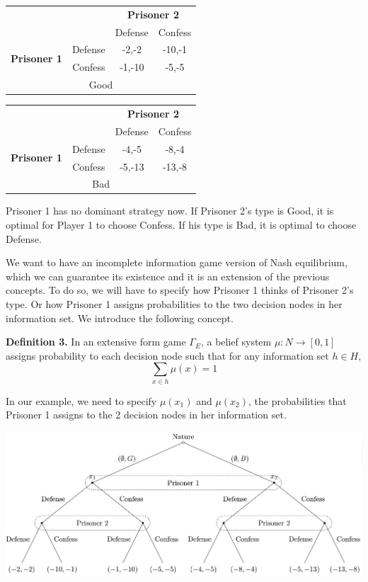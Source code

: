 \documentclass[12pt, oneside]{article}
\begin{document}
\begin{table}[h]
    \renewcommand{\arraystretch}{1.2}
    \setlength{\tabcolsep}{8pt}
    \begin{tabular}{c c|c c|}
        \multicolumn{2}{c}{} & \multicolumn{2}{c}{\textbf{Prisoner 2}} \\
        \multicolumn{2}{c}{} & Defense & Confess \\
        \cline{2-4}
        \multirow{2}{*}{\textbf{Prisoner 1}} & Defense & -2,-2 & -10,-1 \\
        & Confess & -1,-10 & -5,-5 \\
        \cline{2-4}
        \multicolumn{4}{c}{Good}
    \end{tabular}
    \hspace{1cm}
    \begin{tabular}{c c|c c|}
        \multicolumn{2}{c}{} & \multicolumn{2}{c}{\textbf{Prisoner 2}} \\
        \multicolumn{2}{c}{} & Defense & Confess \\
        \cline{2-4}
        \multirow{2}{*}{\textbf{Prisoner 1}} & Defense & -4,-5 & -8,-4 \\
        & Confess & -5,-13 & -13,-8 \\
        \cline{2-4}
        \multicolumn{4}{c}{Bad}
    \end{tabular}
\end{table}

Prisoner 1 has no dominant strategy now. If Prisoner 2's type is Good, it is optimal for Player 1 to choose Confess. If his type is Bad, it is optimal to choose Defense.

We want to have an incomplete information game version of Nash equilibrium, which we can guarantee its existence and it is an extension of the previous concepts. To do so, we will have to specify how Prisoner 1 thinks of Prisoner 2's type. Or how Prisoner 1 assigns probabilities to the two decision nodes in her information set. We introduce the following concept.

\textbf{Definition 3.} In an extensive form game \( \Gamma_E \), a belief system \( \mu : N \to [0,1] \) assigns probability to each decision node such that for any information set \( h \in H \),
\[
\sum_{x \in h} \mu(x) = 1
\]

In our example, we need to specify \( \mu(x_1) \) and \( \mu(x_2) \), the probabilities that Prisoner 1 assigns to the 2 decision nodes in her information set.

\includegraphics{Figure/incom_tree_bey.png}
\end{document}
